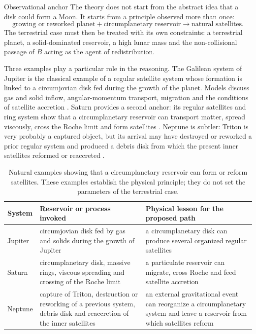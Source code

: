 \documentclass[11pt,a4paper,openany]{report}
\begin{document}
\begin{principe}{Observational anchor}
The theory does not start from the abstract idea that a disk could form a Moon. It starts from a
principle observed more than once:
\begin{equation}
\boxed{\;\text{growing or reworked planet}+\text{circumplanetary reservoir}
\longrightarrow \text{natural satellites}.\;}
\label{eq:ancrage-satellites}
\end{equation}
The terrestrial case must then be treated with its own constraints: a terrestrial planet, a
solid-dominated reservoir, a high lunar mass and the non-collisional passage of $B$ acting as the
agent of redistribution.
\end{principe}

Three examples play a particular role in the reasoning. The Galilean system of Jupiter is the
classical example of a regular satellite system whose formation is linked to a circumjovian disk
fed during the growth of the planet. Models discuss gas and solid inflow, angular-momentum
transport, migration and the conditions of satellite accretion
\cite{CanupWard2002,MosqueiraEstrada2003a,CanupWard2006,Nimmo2026}. Saturn provides a second
anchor: its regular satellites and ring system show that a circumplanetary reservoir can transport
matter, spread viscously, cross the Roche limit and form satellites
\cite{Charnoz2010,CridaCharnoz2012,Blanc2025}. Neptune is subtler: Triton is very probably a
captured object, but its arrival may have destroyed or reworked a prior regular system and
produced a debris disk from which the present inner satellites reformed or reaccreted
\cite{AgnorHamilton2006,BanfieldMurray1992,Showalter2019,Szulagyi2018,Davis2026}.

\begin{table}[htbp]
\centering
\small
\caption{Natural examples showing that a circumplanetary reservoir can form or reform satellites.
These examples establish the physical principle; they do not set the parameters of the terrestrial
case.}
\label{tab:ancrage-satellites}
\begin{tabularx}{\textwidth}{>{\raggedright\arraybackslash}p{2.4cm}
>{\raggedright\arraybackslash}X >{\raggedright\arraybackslash}X}
\toprule
\textbf{System} & \textbf{Reservoir or process invoked} & \textbf{Physical lesson for the proposed path} \\
\midrule
Jupiter & circumjovian disk fed by gas and solids during the growth of Jupiter &
a circumplanetary disk can produce several organized regular satellites \\
Saturn & circumplanetary disk, massive rings, viscous spreading and crossing of the Roche limit &
a particulate reservoir can migrate, cross Roche and feed satellite accretion \\
Neptune & capture of Triton, destruction or reworking of a previous system, debris disk and
reaccretion of the inner satellites &
an external gravitational event can reorganize a circumplanetary system and leave a reservoir from
which satellites reform \\
\bottomrule
\end{tabularx}
\end{table}
\end{document}
